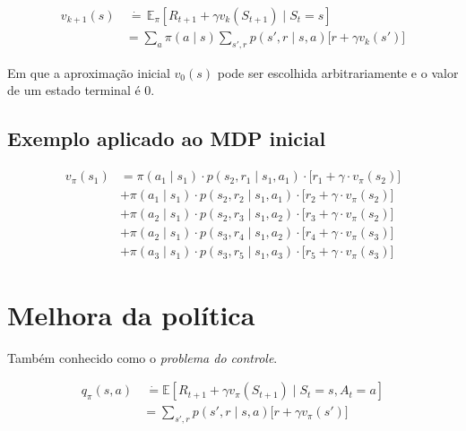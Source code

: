 \documentclass{article}
\begin{document}
        \begin{equation}
            \begin{split}
                v_{k+1}(s) & \ \dot{=} \, \mathbb{E}_{\pi} \left[ R_{t+1} + \gamma v_k(S_{t+1}) \mid S_t = s \right] \\
                & = \sum_a \pi(a \mid s) \sum_{s',r} p(s',r \mid s,a) \Big[ r + \gamma v_k(s') \Big]
            \end{split}
        \end{equation}
        
        Em que a aproximação inicial $v_0(s)$ pode ser escolhida arbitrariamente e o valor de um estado terminal é $0$.
        
        \subsection{Exemplo aplicado ao MDP inicial}
        
            \begin{equation}
                \begin{split}
                    v_\pi(s_1) &= \pi(a_1 \mid s_1) \cdot p(s_2, r_1 \mid s_1, a_1) \cdot \Big[ r_1 + \gamma \cdot v_\pi(s_2) \Big] \\
                               &+ \pi(a_1 \mid s_1) \cdot p(s_2, r_2 \mid s_1, a_1) \cdot \Big[ r_2 + \gamma \cdot v_\pi(s_2) \Big] \\
                               &+ \pi(a_2 \mid s_1) \cdot p(s_2, r_3 \mid s_1, a_2) \cdot \Big[ r_3 + \gamma \cdot v_\pi(s_2) \Big] \\
                               &+ \pi(a_2 \mid s_1) \cdot p(s_3, r_4 \mid s_1, a_2) \cdot \Big[ r_4 + \gamma \cdot v_\pi(s_3) \Big] \\
                               &+ \pi(a_3 \mid s_1) \cdot p(s_3, r_5 \mid s_1, a_3) \cdot \Big[ r_5 + \gamma \cdot v_\pi(s_3) \Big]
                \end{split}
            \end{equation}
        
    \section{Melhora da política}
    
        Também conhecido como o \textit{problema do controle}.
        
        \begin{equation}
            \begin{split}
                q_{\pi}(s,a) & \ \dot{=} \mathbb{E} \left[ R_{t+1} + \gamma v_{\pi}(S_{t+1}) \mid S_t = s, A_t = a \right] \\
                & = \sum_{s',r} p(s', r \mid s, a) \Big[ r + \gamma v_{\pi}(s') \Big]
            \end{split}
        \end{equation}
    
\end{document}
